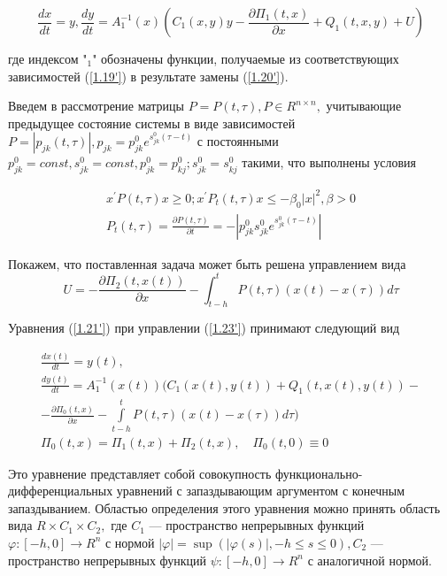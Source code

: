 \begin{equation} \label{1.21'}
\frac{dx}{dt} = y, \frac{dy}{dt} = A^{-1}_1(x) (C_1(x, y) y - \frac{\partial \Pi_1 (t, x)}{\partial x} + Q_1 (t, x, y) + U)
\end{equation}

где индексом "$_1$" обозначены функции, получаемые из соответствующих зависимостей (\ref{1.19'}) в результате замены (\ref{1.20'}).

Введем в рассмотрение матрицы $P = P(t, \tau), P \in R^{n \times n},$ учитывающие предыдущее состояние системы в виде зависимостей $P = \left| p_{jk} (t, \tau) \right|, p_{jk} = p_{jk}^0 e^{s_{jk}^0 (\tau - t)}$ с постоянными $p_{jk}^0 = const, s_{jk}^0 = const, p_{jk}^0 = p_{kj}^0; s_{jk}^0 = s_{kj}^0$ такими, что выполнены условия


\begin{equation} \label{1.22'}
	\begin{array}{c}
		x^{'} P (t, \tau) x \ge 0; x^{'} P_t (t, \tau) x \le - \beta_0 \left| x \right|^2, \beta > 0\\
		P_t(t, \tau) = \frac{\partial P (t, \tau)}{\partial t} = - \left| p_{jk}^0 s_{jk}^{0} e^{s_{jk}^0 (\tau - t)} \right|
	\end{array}
\end{equation}

Покажем, что поставленная задача может быть решена управлением вида
\begin{equation} \label{1.23'}
U = - \frac{\partial \Pi_2 (t, x(t))}{\partial x} - \int_{t - h}^{t} P(t, \tau) (x(t) - x(\tau)) d \tau
\end{equation}

Уравнения (\ref{1.21'}) при управлении (\ref{1.23'}) принимают следующий вид

\begin{equation} \label{1.24'}
\begin{array}{c}
\frac{d x(t)}{dt}=y(t),\\
\frac{d y(t)}{dt} = A_1^{-1} (x(t)) (C_1(x(t), y(t)) + Q_1(t, x(t), y(t)) -\\- \frac{\partial \Pi_0 (t, x)}{\partial x} - \int \limits_{t - h}^{t} P(t, \tau) (x(t) - x(\tau)) d \tau)\\
\Pi_0 (t, x) = \Pi_1(t, x) + \Pi_2 (t, x), \quad \Pi_0 (t, 0) \equiv 0
\end{array}
\end{equation}

Это уравнение представляет собой совокупность функционально-дифференциальных уравнений с запаздывающим аргументом с конечным запаздыванием. Областью определения этого уравнения можно принять область вида $R \times C_1 \times C_2,$ где $C_1$ --- пространство непрерывных функций $\varphi : [-h, 0] \to R^n$ с нормой $\left| \varphi \right| = \sup (\left| \varphi(s) \right|, -h \le s \le 0), C_2$ --- пространство непрерывных функций $\psi : [-h, 0] \to R^n$ с аналогичной нормой.

